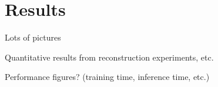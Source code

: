 \section{Results}
\label{sec:results}

Lots of pictures

Quantitative results from reconstruction experiments, etc.

Performance figures? (training time, inference time, etc.)